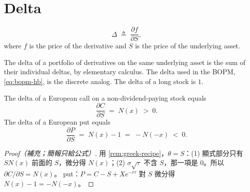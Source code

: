 \section{Delta}
\label{sec:delta}


\begin{definition}
	\[
		\Delta \;\triangleq\; \frac{\partial f}{\partial S} ,
	\]
	where $f$ is the price of the derivative and $S$ is the price of the underlying asset.
\end{definition}

\suppstart
{}
\suppend

The delta of a portfolio of derivatives on the same underlying asset is the sum of their individual deltas, by elementary calculus.
The delta used in the BOPM, \eqref{eq:bopm-hb}, is the discrete analog.
The delta of a long stock is $1$.

\suppstart
{}
\suppend


\begin{proposition}
	The delta of a European call on a non-dividend-paying stock equals
	\begin{equation}
		\frac{\partial C}{\partial S} \;=\; N(x) \;>\; 0 .
		\label{eq:delta-call}
	\end{equation}
	The delta of a European put equals
	\begin{equation}
		\frac{\partial P}{\partial S} \;=\; N(x)-1 \;=\; -N(-x) \;<\; 0 .
		\label{eq:delta-put}
	\end{equation}
\end{proposition}

\suppstart
{}

\begin{proof}[Proof（補充；簡報只給公式）]
	用 \autoref{rem:greek-recipe}，$\theta=S$：(1) 顯式部分只有 $SN(x)$ 前面的 $S$，微分得 $N(x)$；(2) $\sigma\sqrt{\tau}$ 不含 $S$，那一項是 $0$。所以 $\partial C/\partial S=N(x)$。
	put：$P=C-S+Xe^{-r\tau}$ 對 $S$ 微分得 $N(x)-1=-N(-x)$。
\end{proof}
\suppend

